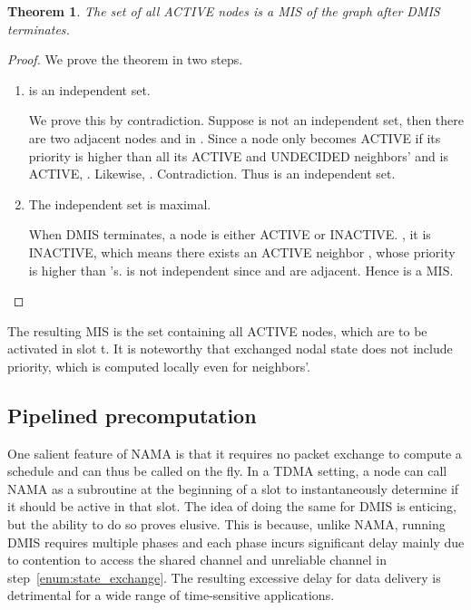 \documentclass[conference]{IEEEtran}
\newtheorem{theorem}{Theorem}
\begin{document}
\begin{theorem}		\label{theorem:dmiscorrect}
The set  of all ACTIVE nodes is a MIS of the graph after DMIS terminates.
\end{theorem}
\begin{proof}
We prove the theorem in two steps. 
\begin{enumerate}
	\item  is an independent set. 
	
	We prove this by contradiction. Suppose  is not an independent set, then there are two adjacent nodes  and  in . Since a node only becomes ACTIVE if its priority is higher than all its ACTIVE and UNDECIDED neighbors' and  is ACTIVE, . Likewise, . Contradiction. Thus  is an independent set.
	\item The independent set  is maximal. 


	When DMIS terminates, a node is either ACTIVE or INACTIVE. , it is INACTIVE, which means there exists an ACTIVE neighbor , whose priority is higher than 's.  is not independent since  and  are adjacent. Hence  is a MIS.
\end{enumerate}
\end{proof}

The resulting MIS is the set containing all ACTIVE nodes, which are to be activated in slot t. It is noteworthy that exchanged nodal state does not include priority, which is computed locally even for neighbors'.




\subsection{Pipelined precomputation}
One salient feature of NAMA is that it requires no packet exchange to compute a schedule and can thus be called on the fly. In a TDMA setting, a node can call NAMA as a subroutine at the beginning of a slot to instantaneously determine if it should be active in that slot. The idea of doing the same for DMIS is enticing, but the ability to do so proves elusive. This is because, 
unlike NAMA, running DMIS requires multiple phases and each phase incurs significant delay mainly due to contention to access the shared channel and unreliable channel in step~\ref{enum:state_exchange}. The resulting excessive delay for data delivery is detrimental for a wide range of time-sensitive applications.
\end{document}

